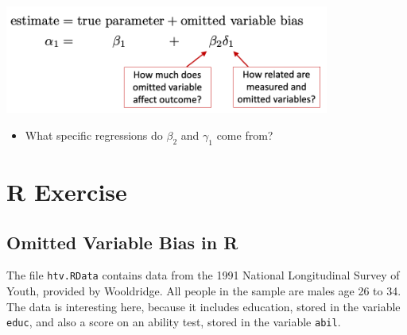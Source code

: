 \documentclass[
]{book}
\providecommand{\tightlist}{%
  \setlength{\itemsep}{0pt}\setlength{\parskip}{0pt}}
\theoremstyle{definition}
\theoremstyle{definition}
\theoremstyle{definition}
\theoremstyle{definition}
\theoremstyle{remark}
\begin{document}
\includegraphics[width=0.8\textwidth,height=\textheight]{images/ovb.png}

\begin{itemize}
\tightlist
\item
  What specific regressions do \(\beta_2\) and \(\gamma_1\) come from?
\end{itemize}

\hypertarget{r-exercise-2}{%
\section{R Exercise}\label{r-exercise-2}}

\hypertarget{omitted-variable-bias-in-r}{%
\subsection{Omitted Variable Bias in R}\label{omitted-variable-bias-in-r}}

The file \texttt{htv.RData} contains data from the 1991 National Longitudinal Survey of Youth, provided by Wooldridge. All people in the sample are males age 26 to 34. The data is interesting here, because it includes education, stored in the variable \texttt{educ}, and also a score on an ability test, stored in the variable \texttt{abil}.
\end{document}
